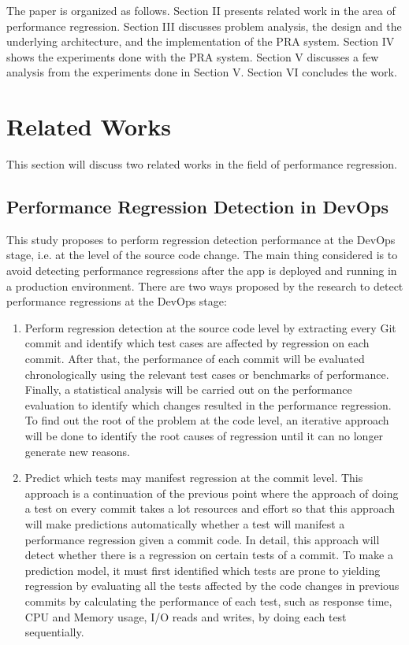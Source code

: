 \documentclass[conference]{configs/IEEEtran}
\begin{document}
The paper is organized as follows. Section II presents related
work in the area of performance regression. Section III discusses problem analysis, the design and the underlying architecture, and the implementation of the PRA system. Section IV shows the experiments done with the PRA system. Section V discusses a few analysis from the experiments done in Section V. Section
VI concludes the work.


\section{Related Works}
This section will discuss two related works in the field of performance regression.

\subsection{Performance Regression Detection in DevOps}
This study \cite{regression-detection} proposes to perform regression detection performance at the DevOps stage, i.e. at the level of the source code change. The main thing considered is to avoid detecting performance regressions after the app is deployed and running in a production environment. There are two ways proposed by the research
to detect performance regressions at the DevOps stage:
\begin{enumerate}
	\item Perform regression detection at the source code level by extracting
	every Git commit and identify which test cases are affected by
	regression on each commit. After that, the performance of each commit will be
	evaluated chronologically using the relevant test cases or
	benchmarks of performance. Finally, a statistical analysis will be carried out on the performance evaluation
	to identify which changes resulted in the performance regression. To find out the root of the problem at the code level, an iterative approach will be done  to identify the root causes of
	regression until it can no longer generate new reasons.
	\item Predict which tests may manifest regression at the commit level. This approach is a continuation of the previous point where
	the approach of doing a test on every commit takes a lot
	resources and effort so that this approach will make predictions
	automatically whether a test will manifest a performance regression given a commit code. In detail, this approach will detect whether there is a regression on certain tests of a commit. To make a prediction model, it must first identified which tests are prone to yielding regression by evaluating all the tests affected by the code changes in previous commits by calculating the performance of each test, such as response time,
	CPU and Memory usage, I/O reads and writes, by doing
	each test sequentially.
\end{enumerate}
\end{document}
